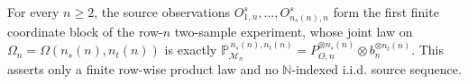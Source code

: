 For every \(n\ge2\), the source observations \(O^s_{1,n},\ldots,O^s_{n_s(n),n}\) form the first finite coordinate block of the row-\(n\) two-sample experiment, whose joint law on \(\Omega_n=\Omega(n_s(n),n_t(n))\) is exactly \(\mathbb P_{\mathcal M_n}^{\,n_s(n),n_t(n)}=P_{O,n}^{\otimes n_s(n)}\otimes b_n^{\otimes n_t(n)}\). This asserts only a finite row-wise product law and no \(\mathbb N\)-indexed i.i.d. source sequence.
